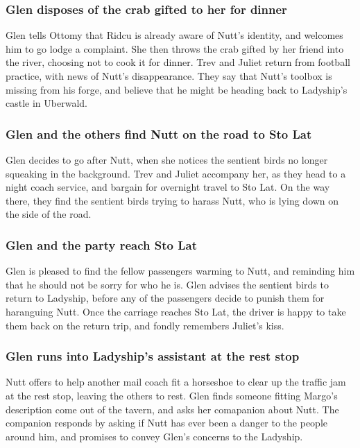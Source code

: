 \subsubsection{\Gls{Glen} disposes of the crab gifted to her for dinner}
\Gls{Glen} tells \Gls{Ottomy} that \Gls{Ridcu} is already aware of \Gls{Nutt}'s identity, and
welcomes him to go lodge a complaint. She then throws the crab gifted by her friend into the river,
choosing not to cook it for dinner. \Gls{Trev} and \Gls{Juliet} return from football practice, with
news of \Gls{Nutt}'s disappearance. They say that \Gls{Nutt}'s toolbox is missing from his forge,
and believe that he might be heading back to \Gls{Ladyship}'s castle in Uberwald.

\subsubsection{\Gls{Glen} and the others find \Gls{Nutt} on the road to Sto Lat}
\Gls{Glen} decides to go after \Gls{Nutt}, when she notices the sentient birds no longer squeaking
in the background. \Gls{Trev} and \Gls{Juliet} accompany her, as they head to a night coach service,
and bargain for overnight travel to Sto Lat. On the way there, they find the sentient birds trying
to harass \Gls{Nutt}, who is lying down on the side of the road.

\subsubsection{\Gls{Glen} and the party reach Sto Lat}
\Gls{Glen} is pleased to find the fellow passengers warming to \Gls{Nutt}, and reminding him that
he should not be sorry for who he is. \Gls{Glen} advises the sentient birds to return to
\Gls{Ladyship}, before any of the passengers decide to punish them for haranguing \Gls{Nutt}.
Once the carriage reaches Sto Lat, the driver is happy to take them back on the return trip, and
fondly remembers \Gls{Juliet}'s kiss.

\subsubsection{\Gls{Glen} runs into \Gls{Ladyship}'s assistant at the rest stop}
\Gls{Nutt} offers to help another mail coach fit a horseshoe to clear up the traffic jam at the
rest stop, leaving the others to rest. \Gls{Glen} finds someone fitting \Gls{Margo}'s description
come out of the tavern, and asks her comapanion about \Gls{Nutt}. The companion responds by asking
if \Gls{Nutt} has ever been a danger to the people around him, and promises to convey \Gls{Glen}'s
concerns to the \Gls{Ladyship}.

